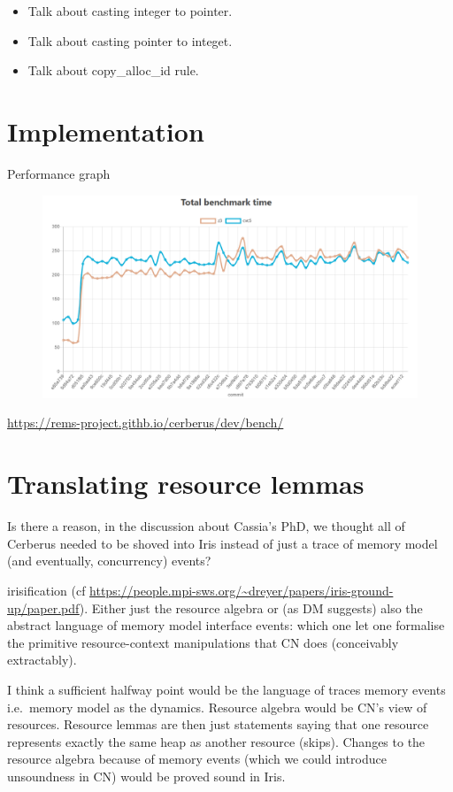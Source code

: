 \begin{itemize}
    \item Talk about casting integer to pointer.
    \item Talk about casting pointer to integet.
    \item Talk about copy\_alloc\_id rule.
\end{itemize}

\section{Implementation}

Performance graph

\begin{figure}[h]
    \centering
    \includegraphics[width=\textwidth]{../misc/vip-performance-hit.png}
\end{figure}

\url{https://rems-project.githb.io/cerberus/dev/bench/}

\section{Translating resource lemmas}\label{sec:trans-res-lemmas}

Is there a reason, in the discussion about Cassia's PhD, we thought all of
Cerberus needed to be shoved into Iris instead of just a trace of memory model
(and eventually, concurrency) events?

irisification (cf
\url{https://people.mpi-sws.org/~dreyer/papers/iris-ground-up/paper.pdf}).  Either
just the resource algebra or (as DM suggests) also the abstract language of
memory model interface events: which one let one formalise the primitive
resource-context manipulations that CN does (conceivably extractably).

I think a sufficient halfway point would be the language of traces memory
events i.e.\ memory model as the dynamics. Resource algebra would be CN's view
of resources. Resource lemmas are then just statements saying that one resource
represents exactly the same heap as another resource (skips). Changes to the
resource algebra because of memory events (which we could introduce unsoundness
in CN) would be proved sound in Iris.

